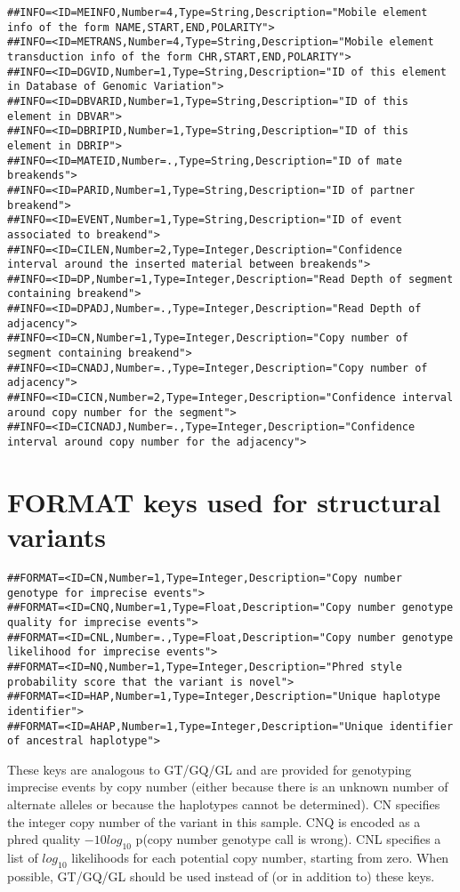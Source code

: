 \documentclass[8pt]{article}
\begin{document}
\begin{verbatim}
##INFO=<ID=MEINFO,Number=4,Type=String,Description="Mobile element info of the form NAME,START,END,POLARITY">
##INFO=<ID=METRANS,Number=4,Type=String,Description="Mobile element transduction info of the form CHR,START,END,POLARITY">
##INFO=<ID=DGVID,Number=1,Type=String,Description="ID of this element in Database of Genomic Variation">
##INFO=<ID=DBVARID,Number=1,Type=String,Description="ID of this element in DBVAR">
##INFO=<ID=DBRIPID,Number=1,Type=String,Description="ID of this element in DBRIP">
##INFO=<ID=MATEID,Number=.,Type=String,Description="ID of mate breakends">
##INFO=<ID=PARID,Number=1,Type=String,Description="ID of partner breakend">
##INFO=<ID=EVENT,Number=1,Type=String,Description="ID of event associated to breakend">
##INFO=<ID=CILEN,Number=2,Type=Integer,Description="Confidence interval around the inserted material between breakends">
##INFO=<ID=DP,Number=1,Type=Integer,Description="Read Depth of segment containing breakend">
##INFO=<ID=DPADJ,Number=.,Type=Integer,Description="Read Depth of adjacency">
##INFO=<ID=CN,Number=1,Type=Integer,Description="Copy number of segment containing breakend">
##INFO=<ID=CNADJ,Number=.,Type=Integer,Description="Copy number of adjacency">
##INFO=<ID=CICN,Number=2,Type=Integer,Description="Confidence interval around copy number for the segment">
##INFO=<ID=CICNADJ,Number=.,Type=Integer,Description="Confidence interval around copy number for the adjacency">
\end{verbatim}
\normalsize
\section{FORMAT keys used for structural variants}
\footnotesize
\begin{verbatim}
##FORMAT=<ID=CN,Number=1,Type=Integer,Description="Copy number genotype for imprecise events">
##FORMAT=<ID=CNQ,Number=1,Type=Float,Description="Copy number genotype quality for imprecise events">
##FORMAT=<ID=CNL,Number=.,Type=Float,Description="Copy number genotype likelihood for imprecise events">
##FORMAT=<ID=NQ,Number=1,Type=Integer,Description="Phred style probability score that the variant is novel">
##FORMAT=<ID=HAP,Number=1,Type=Integer,Description="Unique haplotype identifier">
##FORMAT=<ID=AHAP,Number=1,Type=Integer,Description="Unique identifier of ancestral haplotype">
\end{verbatim}
\normalsize
These keys are analogous to GT/GQ/GL and are provided for genotyping imprecise events by copy number (either because there is an unknown number of alternate alleles or because the haplotypes cannot be determined). CN specifies the integer copy number of the variant in this sample. CNQ is encoded as a phred quality $-10log_{10}$ p(copy number genotype call is wrong). CNL specifies a list of $log_{10}$ likelihoods for each potential copy number, starting from zero. When possible, GT/GQ/GL should be used instead of (or in addition to) these keys.
\end{document}

